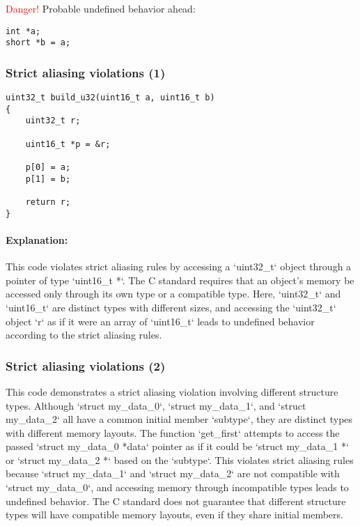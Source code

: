 \documentclass[12pt]{article}
\begin{document}
\textcolor{red}{Danger!} Probable undefined behavior ahead:

\begin{lstlisting}
int *a;
short *b = a;
\end{lstlisting}
\subsubsection{Strict aliasing violations (1)}

\begin{lstlisting}
uint32_t build_u32(uint16_t a, uint16_t b)
{
    uint32_t r;

    uint16_t *p = &r;

    p[0] = a;
    p[1] = b;

    return r;
}
\end{lstlisting}

\paragraph{Explanation:}
This code violates strict aliasing rules by accessing a `uint32\_t` object through a pointer of type `uint16\_t *`. The C standard requires that an object's memory be accessed only through its own type or a compatible type. Here, `uint32\_t` and `uint16\_t` are distinct types with different sizes, and accessing the `uint32\_t` object `r` as if it were an array of `uint16\_t` leads to undefined behavior according to the strict aliasing rules.



\subsubsection{Strict aliasing violations (2)}

This code demonstrates a strict aliasing violation involving different structure types. Although `struct my\_data\_0`, `struct my\_data\_1`, and `struct my\_data\_2` all have a common initial member `subtype`, they are distinct types with different memory layouts. The function `get\_first` attempts to access the passed `struct my\_data\_0 *data` pointer as if it could be `struct my\_data\_1 *` or `struct my\_data\_2 *` based on the `subtype`. This violates strict aliasing rules because `struct my\_data\_1` and `struct my\_data\_2` are not compatible with `struct my\_data\_0`, and accessing memory through incompatible types leads to undefined behavior. The C standard does not guarantee that different structure types will have compatible memory layouts, even if they share initial members.
\end{document}
